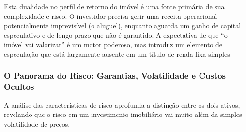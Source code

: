 \documentclass[
  a4paper,
]{book}
\begin{document}
Esta dualidade no perfil de retorno do imóvel é uma fonte primária de
sua complexidade e risco. O investidor precisa gerir uma receita
operacional potencialmente imprevisível (o aluguel), enquanto aguarda um
ganho de capital especulativo e de longo prazo que não é garantido. A
expectativa de que ``o imóvel vai valorizar'' é um motor poderoso, mas
introduz um elemento de especulação que está largamente ausente em um
título de renda fixa simples.

\subsubsection{O Panorama do Risco: Garantias, Volatilidade e Custos
Ocultos}\label{o-panorama-do-risco-garantias-volatilidade-e-custos-ocultos}

A análise das características de risco aprofunda a distinção entre os
dois ativos, revelando que o risco em um investimento imobiliário vai
muito além da simples volatilidade de preços.
\end{document}
